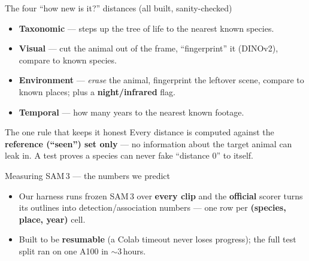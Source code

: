 \documentclass[aspectratio=169,11pt]{beamer}
\newcommand{\frozen}[1]{{\color{navy}\textbf{#1}}}
\begin{document}
\begin{frame}{The four ``how new is it?'' distances \small(all built, sanity-checked)}
  \begin{itemize}
    \item \textbf{Taxonomic} --- steps up the tree of life to the nearest known species.
    \item \textbf{Visual} --- cut the animal out of the frame, ``fingerprint'' it (DINOv2), compare to
          known species.
    \item \textbf{Environment} --- \emph{erase} the animal, fingerprint the leftover scene, compare to
          known places; plus a \textbf{night/infrared} flag.
    \item \textbf{Temporal} --- how many years to the nearest known footage.
  \end{itemize}
  \vspace{0.3em}
  \begin{block}{The one rule that keeps it honest}
    \centering\footnotesize Every distance is computed against the \frozen{reference (``seen'') set only}
    --- no information about the target animal can leak in. A test proves a species can never fake
    ``distance 0'' to itself.
  \end{block}
\end{frame}

\begin{frame}{Measuring SAM\,3 --- the numbers we predict}
  \centering
  \vspace{0.5em}
  \begin{itemize}\footnotesize
    \item Our harness runs frozen SAM\,3 over \textbf{every clip} and the \textbf{official} scorer turns
          its outlines into detection/association numbers --- one row per \textbf{(species, place, year)} cell.
    \item Built to be \textbf{resumable} (a Colab timeout never loses progress); the full test split ran on
          one A100 in $\sim$3\,hours.
  \end{itemize}
\end{frame}
\end{document}
